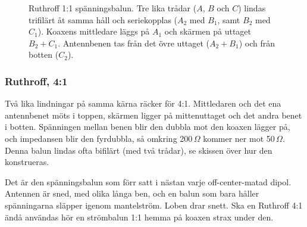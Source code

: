 \begin{figure}[H]
    \caption{Ruthroff 1:1 spänningsbalun. Tre lika trådar ($A$, $B$ och $C$)
    lindas trifilärt åt samma håll och seriekopplas ($A_2$ med $B_1$, samt $B_2$
    med $C_1$). Koaxens mittledare läggs på $A_1$ och skärmen på uttaget
    $B_2{+}C_1$. Antennbenen tas från det övre uttaget ($A_2{+}B_1$) och från
    botten ($C_2$).}
    \label{fig:ruthroff-11}
    \end{figure}


\subsubsection{Ruthroff, 4:1}
\label{sec:ruthroff-41}

Två lika lindningar på samma kärna räcker för 4:1. Mittledaren och det
ena antennbenet möts i toppen, skärmen ligger på mittenuttaget och det
andra benet i botten. Spänningen mellan benen blir den dubbla mot den
koaxen lägger på, och impedansen blir den fyrdubbla, så omkring
200\,$\Omega$ kommer ner mot 50\,$\Omega$. Denna balun lindas ofta
bifilärt (med två trådar), se skissen över hur den konstrueras.

Det är den spänningsbalun som förr satt i nästan varje
off-center-matad dipol. Antennen är sned, med olika långa ben, och en
balun som bara håller spänningarna släpper igenom mantelström. Loben
drar snett. Ska en Ruthroff 4:1 ändå användas hör en strömbalun 1:1
hemma på koaxen strax under den.

